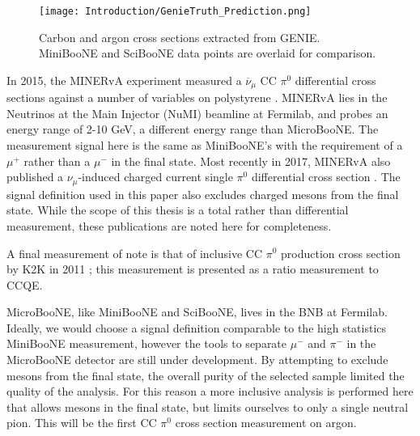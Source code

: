 \begin{figure}[H]
\centering
\texttt{[image: Introduction/GenieTruth\_Prediction.png]}
\caption{ Carbon and argon cross sections extracted from GENIE. MiniBooNE and SciBooNE data points are overlaid for comparison. }
\label{fig:genie_extracted_xsec}
\end{figure}

\par In 2015, the MINERvA experiment measured a $\overline{\nu}_\mu$ CC $\pi^0$ differential cross sections against a number of variables on polystyrene \cite{bib:minerva_thesis} \cite{bib:minerva_paper}.  MINERvA lies in the Neutrinos at the Main Injector (NuMI) beamline at Fermilab, and probes an energy range of 2-10 GeV, a different energy range than MicroBooNE.  The measurement signal here is the same as MiniBooNE's with the requirement of a $\mu^+$ rather than a $\mu^-$ in the final state. Most recently in 2017, MINERvA also published a $\nu_\mu$-induced charged current single $\pi^0$ differential cross section \cite{bib:minerva_paper_2017}.  The signal definition used in this paper also excludes charged mesons from the final state. While the scope of this thesis is a total rather than differential measurement, these publications are noted here for completeness. 
\par A final measurement of note is that of inclusive CC $\pi^0$ production cross section by K2K in 2011 \cite{bib:k2k_paper}; this measurement is presented as a ratio measurement to CCQE.  
\par MicroBooNE, like MiniBooNE and SciBooNE, lives in the BNB at Fermilab. Ideally, we would choose a signal definition comparable to the high statistics MiniBooNE measurement, however the tools to separate $\mu^-$ and $\pi^-$ in the MicroBooNE detector are still under development. By attempting to exclude mesons from the final state, the overall purity of the selected sample limited the quality of the analysis. For this reason a more inclusive analysis is performed here that allows mesons in the final state, but limits ourselves to only a single neutral pion. This will be the first CC $\pi^0$ cross section measurement on argon.

